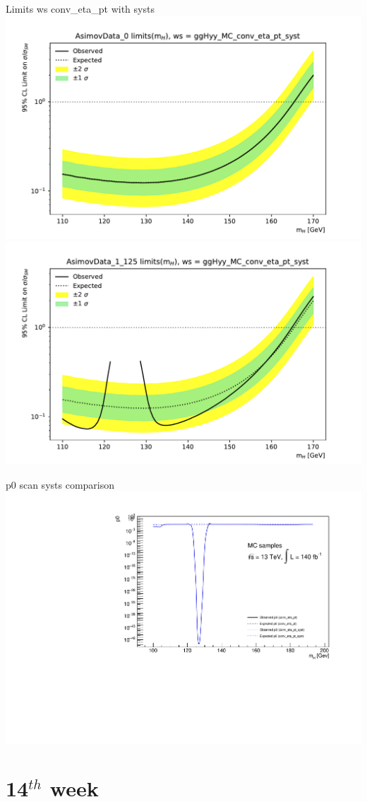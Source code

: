 \documentclass[10pt,UKenglish, leqno, xcolor = dvipsnames]{beamer}
\begin{document}
		\begin{frame}{Limits ws conv\_eta\_pt with systs}
		 	\vfill
		 	\centering
		 	\includegraphics[width=.49\textwidth]{../images/week_13/plot_AsimovData_0_ggHyy_MC_conv_eta_pt_syst.pdf}
		 	\includegraphics[width=.49\textwidth]{../images/week_13/plot_AsimovData_1_125_ggHyy_MC_conv_eta_pt_syst.pdf}
		 	\vfill
		\end{frame}
	
		\begin{frame}{p0 scan systs comparison}
			\vfill
			\centering
			\includegraphics[width=.9\textwidth]{../images/week_13/p0_plot_comp_syst.pdf}
			\vfill
		\end{frame}
	
	\section{14$^{th}$ week}
	\SectionPage
	
\end{document}
